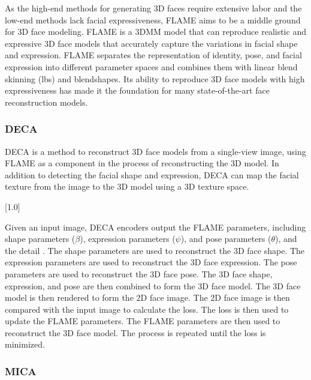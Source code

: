 As the high-end methods for generating 3D faces require extensive labor and the low-end methods lack facial expressiveness, FLAME \cite{liLearningModelFacial2017} aims to be a middle ground for 3D face modeling. FLAME is a 3DMM model that can reproduce realistic and expressive 3D face models that accurately capture the variations in facial shape and expression. FLAME separates the representation of identity, pose, and facial expression into different parameter spaces and combines them with linear blend skinning (\acrshort{lbs}) and blendshapes. Its ability to reproduce 3D face models with high expressiveness has made it the foundation for many state-of-the-art face reconstruction models.


\subsubsection{DECA}

DECA \cite{fengLearningAnimatableDetailed2021} is a method to reconstruct 3D face models from a single-view image, using FLAME as a component in the process of reconstructing the 3D model. In addition to detecting the facial shape and expression, DECA can map the facial texture from the image to the 3D model using a 3D texture space.

[1.0]

Given an input image, DECA encoders output the FLAME parameters, including shape parameters ($\beta$), expression parameters ($\psi$), and pose parameters ($\theta$), and the detail . The shape parameters are used to reconstruct the 3D face shape. The expression parameters are used to reconstruct the 3D face expression. The pose parameters are used to reconstruct the 3D face pose. The 3D face shape, expression, and pose are then combined to form the 3D face model. The 3D face model is then rendered to form the 2D face image. The 2D face image is then compared with the input image to calculate the loss. The loss is then used to update the FLAME parameters. The FLAME parameters are then used to reconstruct the 3D face model. The process is repeated until the loss is minimized.

\subsubsection{MICA}

